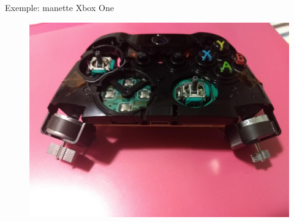 \begin{frame}{Exemple: manette Xbox One}
\begin{figure}
\centering
\includegraphics[width=\linewidth]{images/xboxone}
\end{figure}
\end{frame}

